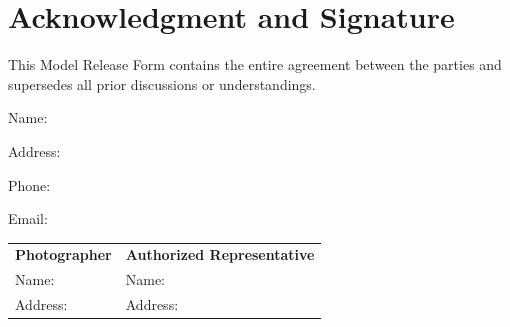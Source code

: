 
\section{Acknowledgment and Signature}
\label{sec:signatures}

This Model Release Form contains the entire agreement between the parties and supersedes all prior discussions or understandings.

\vspace{0.3in}

\hspace{3in}
Name: \ModelName{}

\vspace{0.1in}

\hspace{3in}
\parbox{3.5in}{
Address: \ModelAddress{}
}
\vspace{0.1in}

\hspace{3in}
Phone: \ModelPhone{}

\vspace{0.1in}

\hspace{3in}
Email: \ModelEmail{}

\vspace{0.3in}

\vspace{0.5in}

\begin{tabular}{p{8cm} p{8cm}}
\textbf{Photographer} & \textbf{Authorized Representative} \\ 
Name: \PhotographerName{} & Name: \RepresentativeName{} \\ 
Address: \PhotographerAddress{} & Address: \RepresentativeAddress{} \\ 
\end{tabular}

